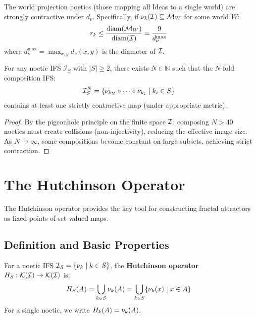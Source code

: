 \begin{proposition}
\label{prop:world-projection}
The world projection noetics (those mapping all Ideas to a single world) are strongly contractive under $d_\nu$. Specifically, if $\nu_{k}(\mathcal{I}) \subseteq \mathcal{M}_W$ for some world $W$:
\[
r_k \leq \frac{\mathrm{diam}(\mathcal{M}_W)}{\mathrm{diam}(\mathcal{I})} = \frac{9}{d_\nu^{\max}}
\]
where $d_\nu^{\max} = \max_{x,y} d_\nu(x, y)$ is the diameter of $\mathcal{I}$.
\end{proposition}

\begin{theorem}
\label{thm:eventual-contraction}
For any noetic IFS $\mathcal{I}_S$ with $|S| \geq 2$, there exists $N \in \mathbb{N}$ such that the $N$-fold composition IFS:
\[
\mathcal{I}_S^N = \{\nu_{k_N} \circ \cdots \circ \nu_{k_1} \mid k_i \in S\}
\]
contains at least one strictly contractive map (under appropriate metric).
\end{theorem}

\begin{proof}
By the pigeonhole principle on the finite space $\mathcal{I}$: composing $N > 40$ noetics must create collisions (non-injectivity), reducing the effective image size. As $N \to \infty$, some compositions become constant on large subsets, achieving strict contraction.
\end{proof}

\section{The Hutchinson Operator}
\label{sec:hutchinson-operator}

\begin{tcolorbox}[colback=blue!5!white,colframe=blue!75!black,title=\vnewthree]
The Hutchinson operator provides the key tool for constructing fractal attractors as fixed points of set-valued maps.
\end{tcolorbox}

\subsection{Definition and Basic Properties}

\begin{definition}
\label{def:hutchinson-operator}
For a noetic IFS $\mathcal{I}_S = \{\nu_{k} \mid k \in S\}$, the \textbf{Hutchinson operator} $H_S : \mathcal{K}(\mathcal{I}) \to \mathcal{K}(\mathcal{I})$ is:
\[
H_S(A) = \bigcup_{k \in S} \nu_{k}(A) = \bigcup_{k \in S} \{\nu_{k}(x) \mid x \in A\}
\]
For a single noetic, we write $H_k(A) = \nu_{k}(A)$.
\end{definition}

